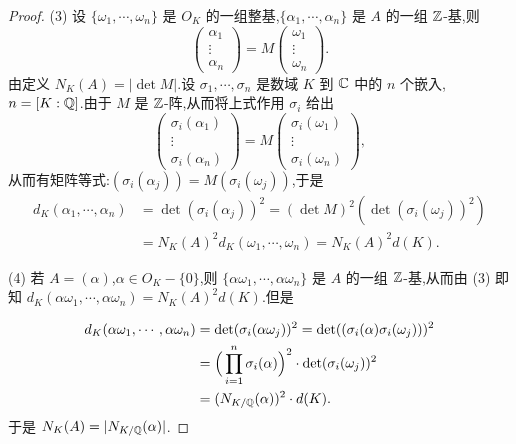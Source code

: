 \begin{proof}
(3) 设 $\{\omega_1,\cdots,\omega_n\}$ 是 $O_K$ 的一组整基,$\{\alpha_1,\cdots,\alpha_n\}$ 是 $A$ 的一组 $\mathbb{Z}$-基,则
\[
  \begin{pmatrix}\alpha_1\\ \vdots\\ \alpha_n\end{pmatrix}
  =M\begin{pmatrix}\omega_1\\ \vdots\\ \omega_n\end{pmatrix}.
\]
由定义 $N_K(A)=|\det M|$.设 $\sigma_1,\cdots,\sigma_n$ 是数域 $K$ 到 $\mathbb{C}$ 中的 $n$ 个嵌入,$n=[K:\mathbb{Q}]$.由于 $M$ 是 $\mathbb{Z}$-阵,从而将上式作用 $\sigma_i$ 给出
\[
  \begin{pmatrix}\sigma_i(\alpha_1)\\ \vdots\\ \sigma_i(\alpha_n)\end{pmatrix}
  =M\begin{pmatrix}\sigma_i(\omega_1)\\ \vdots\\ \sigma_i(\omega_n)\end{pmatrix},
\]
从而有矩阵等式:$(\sigma_i(\alpha_j))=M(\sigma_i(\omega_j))$,于是
\begin{align*}
  d_K(\alpha_1,\cdots,\alpha_n)
  &=\det(\sigma_i(\alpha_j))^2=(\det M)^2(\det(\sigma_i(\omega_j))^2)\\
  &=N_K(A)^2d_K(\omega_1,\cdots,\omega_n)=N_K(A)^2d(K).
\end{align*}

\begin{sloppypar}
(4) 若 $A=(\alpha)$,$\alpha\in O_K-\{0\}$,则 $\{\alpha\omega_1,\cdots,\alpha\omega_n\}$ 是 $A$ 的一组 $\mathbb{Z}$-基,\allowbreak 从而由 (3) 即知 $d_K(\alpha\omega_1,\cdots,\alpha\omega_n)=N_K(A)^2d(K)$.但是
\end{sloppypar}
\begin{align*}
  d_K(\alpha\omega_1,\cdots,\alpha\omega_n)
  &=\det(\sigma_i(\alpha\omega_j))^2=\det((\sigma_i(\alpha)\sigma_i(\omega_j)))^2\\
  &=\Big(\prod_{i=1}^{n}\sigma_i(\alpha)\Big)^2\cdot\det(\sigma_i(\omega_j))^2\\
  &=(N_{K/\mathbb{Q}}(\alpha))^2\cdot d(K).
\end{align*}
于是 $N_K(A)=|N_{K/\mathbb{Q}}(\alpha)|$.
\end{proof}

